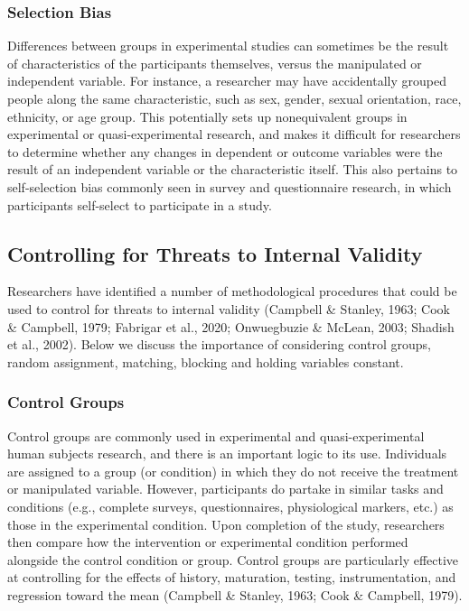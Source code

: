 \documentclass[
  11pt,
]{book}
\begin{document}
\hypertarget{selection-bias}{%
\subsubsection{Selection Bias}\label{selection-bias}}

Differences between groups in experimental studies can sometimes be the result of characteristics of the participants themselves, versus the manipulated or independent variable. For instance, a researcher may have accidentally grouped people along the same characteristic, such as sex, gender, sexual orientation, race, ethnicity, or age group. This potentially sets up nonequivalent groups in experimental or quasi-experimental research, and makes it difficult for researchers to determine whether any changes in dependent or outcome variables were the result of an independent variable or the characteristic itself. This also pertains to self-selection bias commonly seen in survey and questionnaire research, in which participants self-select to participate in a study.

\hypertarget{controlling-for-threats-to-internal-validity}{%
\subsection{Controlling for Threats to Internal Validity}\label{controlling-for-threats-to-internal-validity}}

Researchers have identified a number of methodological procedures that could be used to control for threats to internal validity (Campbell \& Stanley, 1963; Cook \& Campbell, 1979; Fabrigar et al., 2020; Onwuegbuzie \& McLean, 2003; Shadish et al., 2002). Below we discuss the importance of considering control groups, random assignment, matching, blocking and holding variables constant.

\hypertarget{control-groups}{%
\subsubsection{Control Groups}\label{control-groups}}

Control groups are commonly used in experimental and quasi-experimental human subjects research, and there is an important logic to its use. Individuals are assigned to a group (or condition) in which they do not receive the treatment or manipulated variable. However, participants do partake in similar tasks and conditions (e.g., complete surveys, questionnaires, physiological markers, etc.) as those in the experimental condition. Upon completion of the study, researchers then compare how the intervention or experimental condition performed alongside the control condition or group. Control groups are particularly effective at controlling for the effects of history, maturation, testing, instrumentation, and regression toward the mean (Campbell \& Stanley, 1963; Cook \& Campbell, 1979).
\end{document}
